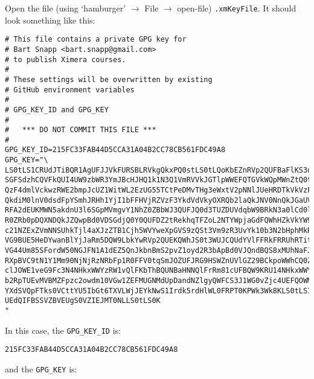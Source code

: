 \documentclass{ximera}
\begin{document}
        Open the file (using `hamburger' $\to$ File $\to$ open-file) \verb!.xmKeyFile!.
        It should look something like this:
        {\pdfOnly{\footnotesize}\begin{verbatim}
# This file contains a private GPG key for 
# Bart Snapp <bart.snapp@gmail.com> 
# to publish Ximera courses.
#
# These settings will be overwritten by existing 
# GitHub environment variables
#
# GPG_KEY_ID and GPG_KEY
#
#   *** DO NOT COMMIT THIS FILE ***
#
GPG_KEY_ID=215FC33FAB44D5CCA31A04B2CC78CB561FDC49A8
GPG_KEY="\
LS0tLS1CRUdJTiBQR1AgUFJJVkFURSBLRVkgQkxPQ0stLS0tLQoKbEZnRVp2QUFBaFlKS3dZQkJB
SGFSdzhCQVFkQUI4UW9zbWR3YmJBcHJHQ1k1N3Q1VmRVVkJGTlpWWEFQTGVkWQpMWnZtQ0tjQUFR
QzF4dmlVckwzRWE2bmpJcUZ1WitWL2EzUG55TCtPeDMvTHg3eWxtV2pNNlJUeHRDTkVkVzF0CmVT
QkdiM0lnV0dsdFpYSmhJRHh1YjI1bFFHVjRZVzF3YkdVdVkyOXRQb2laQkJNV0NnQkJGaUVFSVYv
RFA2dEUKMWN5akdnU3l6SGpMVmgvY1NhZ0ZBbWJ3QUFJQ0d3TUZDUVdqbW9BRkN3a0lCd0lDSWdJ
R0ZRb0pDQXNDQkJZQwpBd0VDSGdjQ0Y0QUFDZ2tRekhqTFZoL2NTYWpjaGdFQWhHZkVkYW9xRnZD
c21NZExZVmNNSUhkTjl4aXJzZTB1Cjh5WVYweXpGVS9zQSt3Vm9zR3UvYk10b3N2bHphMkRJUkQ3
VG9BUE5HeDYwanBlYjJaRm5DQW9LbkYwRVp2QUEKQWhJS0t3WUJCQUdYVlFFRkFRRUhRTitNMW52
VG44Um85SFordW50NGJFN1A1dEZ5QnJkbnBmS2pvZ1oyd2R3bApBd0VJQndBQS8xMUhNaFJuTnFL
RXpBVC9tN1Y1Mm90NjNjRzNRbFp1R0FFV0tqSmJOZUFJRG9HSWZnUVlGZ29BCkpoWWhCQ0Zmd3or
clJOWE1veG9Fc3N4NHkxWWYzRW1vQlFKbThBQUNBaHNNQlFrRm81cUFBQW9KRU14NHkxWWYKM0Vt
b2RpTUEvMVBMZFpzc2owdm10VGw1ZEFMUGNMdUpDandNZlgyQWFCS3J1WG0vZjc4UEFQOWM2eHdh
YXdSVQpFTks0VCttYU5IbGt6TXVLWjJEYkNwS1Irdk5rdHlWL0FRPT0KPWk3Wk8KLS0tLS1FTkQg
UEdQIFBSSVZBVEUgS0VZIEJMT0NLLS0tLS0K
"
\end{verbatim}
        }\pdfOnly{\columnbreak}
        In this case, the \verb!GPG_KEY_ID! is:
        \begin{verbatim}
215FC33FAB44D5CCA31A04B2CC78CB561FDC49A8
\end{verbatim}
        and the \verb!GPG_KEY! is:
\end{document}
